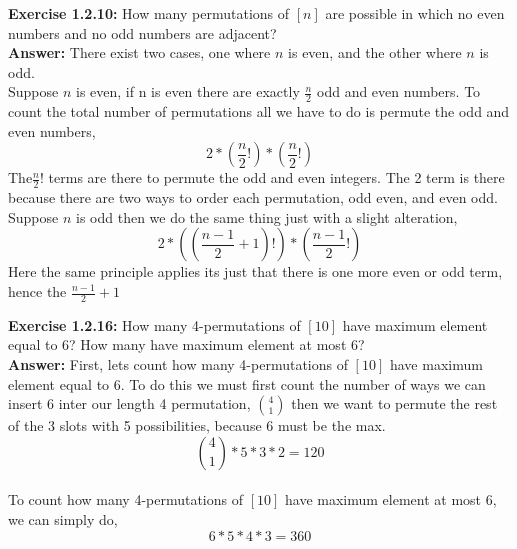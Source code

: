 \documentclass{amsart}
\begin{document}
\noindent\textbf{Exercise 1.2.10: } How many permutations of $[n]$ are possible in which no even numbers and no odd numbers are adjacent?\\

\noindent \textbf{Answer:}
There exist two cases, one where $n$ is even, and the other where $n$ is odd.\\
Suppose $n$ is even, if n is even there are exactly $\frac{n}{2}$ odd and even numbers. To count the total number of permutations all we have to do is permute the odd and even numbers, \\
\begin{equation}
2*(\frac{n}{2}!)*(\frac{n}{2}!)
\end{equation}
The$\frac{n}{2}!$ terms are there to permute the odd and even integers. The 2 term is there because there are two ways to order each permutation, odd even, and even odd.\\

Suppose $n$ is odd then we do the same thing just with a slight alteration,
\begin{equation}
2*((\frac{n-1}{2}+1)!)*(\frac{n-1}{2}!)
\end{equation}
Here the same principle applies its just that there is one more even or odd term, hence the $\frac{n-1}{2}+1$
\\



\vspace{1in}

\noindent\textbf{Exercise 1.2.16: } How many 4-permutations of $[10]$ have maximum element equal to 6? How many have maximum element at most 6?\\

\noindent \textbf{Answer:}
First, lets count how many 4-permutations of $[10]$ have maximum element equal to 6. To do this we must first count the number of ways we can insert 6 inter our length 4 permutation, $4\choose1$ then we want to permute the rest of the 3 slots with 5 possibilities, because 6 must be the max.
\begin{equation}
{{4} \choose {1}}*5*3*2=120
\end{equation}
\vspace{1in}\\
To count how many 4-permutations of $[10]$ have maximum element at most 6, we can simply do,
\begin{equation}
6*5*4*3=360
\end{equation}
\end{document}
